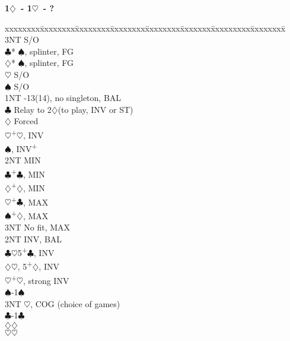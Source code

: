 \documentclass[10pt]{article}
\renewcommand{\c}{$\clubsuit$}
\renewcommand{\d}{$\diamondsuit$}
\newcommand{\h}{$\heartsuit$}
\newcommand{\s}{$\spadesuit$}
\newcommand{\p}{\textsuperscript{+}}
\newenvironment{bidtable}[1][]
{\textbf{#1}
  \begin{adjustwidth}{1em}{}
    \addvspace{2pt}
    \begin{tabbing}
      xxxxxxxx\=xxxxxxxx\=xxxxxxxx\=xxxxxxxx\=xxxxxxxx\=xxxxxxx\=xxxxxxxxx\=xxxxxxxx\=\kill}
{\end{tabbing}\end{adjustwidth}\bigskip}%
\begin{document}
\begin{bidtable}[1\d\ - 1\h\ - ?]
     \> 3NT  \> S/O                                             \\
     \c* {}\s, splinter, FG                               \\
     \d* {}\s, splinter, FG                               \\
     \h  \> S/O                                             \\
     \s  \> S/O                                             \\
1NT  -13(14), no singleton, BAL                            \\%
     \c  \> Relay to 2\d (to play, INV or ST)               \\
     \>      \d \> Forced                                   \\
     \>      \>     \h  {}\p\h, INV                       \\
     \>      \>     \s  {}, INV\p                      \\
     \>      \>     \>      \> 2NT   \> MIN                     \\
     \>      \>     \>      \c   {}\p\c, MIN              \\
     \>      \>     \>      \d   {}\p\d, MIN              \\
     \>      \>     \>      \h   {}\p\c, MAX              \\
     \>      \>     \>      \s   {}\p\d, MAX              \\
     \>      \>     \>      \> 3NT   \> No fit, MAX             \\
     \>      \>     \> 2NT  \> INV, BAL                         \\
     \>      \>     \c  {}\h 5\p\c, INV                   \\
     \>      \>     \d  {}\h, 5\p\d, INV                  \\
     \>      \>     \h  {}\p\h, strong INV                \\
     \>      \>     \s  {}-1\s                            \\
     \>      \>     \> 3NT  \h, COG (choice of games)       \\
     \>      \>     \c  {}-1\c                            \\
     \>      \>     \d  {}\d                              \\
     \>      \>     \h  {}\h                              \\

\end{bidtable}
\end{document}
